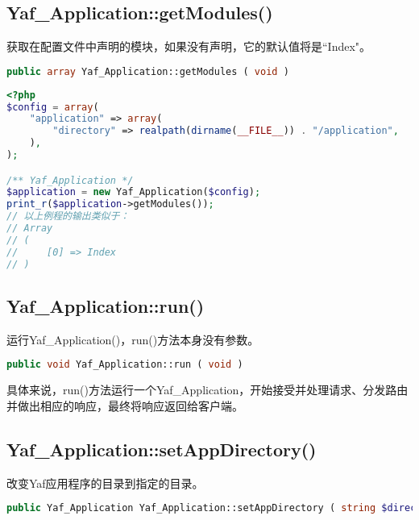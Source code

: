 \subsection{Yaf\_Application::getModules()}

获取在配置文件中声明的模块，如果没有声明，它的默认值将是``Index"。





\begin{lstlisting}[language=PHP]
public array Yaf_Application::getModules ( void )
\end{lstlisting}

\begin{lstlisting}[language=PHP]
<?php
$config = array(
    "application" => array(
        "directory" => realpath(dirname(__FILE__)) . "/application",
    ),
);

/** Yaf_Application */
$application = new Yaf_Application($config);
print_r($application->getModules());
// 以上例程的输出类似于：
// Array
// (
//     [0] => Index
// )
\end{lstlisting}


\subsection{Yaf\_Application::run()}

运行Yaf\_Application()，run()方法本身没有参数。





\begin{lstlisting}[language=PHP]
public void Yaf_Application::run ( void )
\end{lstlisting}

具体来说，run()方法运行一个Yaf\_Application，开始接受并处理请求、分发路由并做出相应的响应，最终将响应返回给客户端。




\subsection{Yaf\_Application::setAppDirectory()}

改变Yaf应用程序的目录到指定的目录。






\begin{lstlisting}[language=PHP]
public Yaf_Application Yaf_Application::setAppDirectory ( string $directory )
\end{lstlisting}



